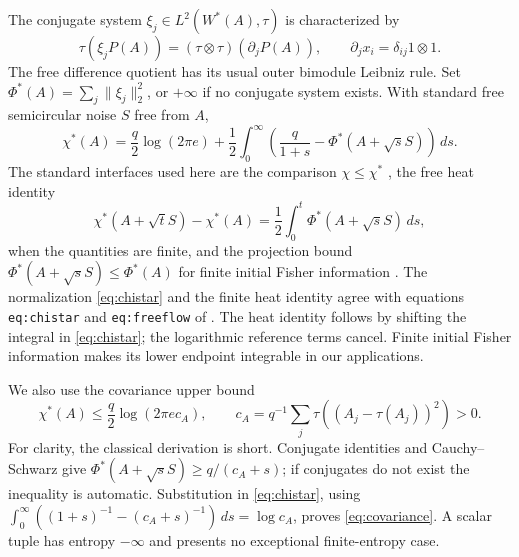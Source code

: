 \documentclass[11pt]{article}
\theoremstyle{definition}\newtheorem{definition}[theorem]{Definition}
\theoremstyle{remark}\newtheorem{remark}[theorem]{Remark}
\begin{document}
The conjugate system $\xi_j\in L^2(W^*(A),\tau)$ is characterized by
\[
 \tau(\xi_j P(A))=(\tau\otimes\tau)(\partial_jP(A)),\qquad
 \partial_jx_i=\delta_{ij}1\otimes1.
\]
The free difference quotient has its usual outer bimodule Leibniz rule.
Set $\Phi^*(A)=\sum_j\|\xi_j\|_2^2$, or $+\infty$ if no conjugate
system exists. With standard free semicircular noise $S$ free from $A$,
\begin{equation}\label{eq:chistar}
 \chi^*(A)=\frac q2\log(2\pi e)+\frac12\int_0^\infty
 \left(\frac q{1+s}-\Phi^*(A+\sqrt s S)\right)\,ds.
\end{equation}
The standard interfaces used here are the comparison
$\chi\leq\chi^*$ \cite{BCG,JP}, the free heat identity
\begin{equation}\label{eq:heat}
 \chi^*(A+\sqrt t S)-\chi^*(A)
 =\frac12\int_0^t\Phi^*(A+\sqrt s S)\,ds,
\end{equation}
when the quantities are finite, and the projection bound
$\Phi^*(A+\sqrt s S)\leq\Phi^*(A)$ for finite initial Fisher
information \cite{Vstar}. The normalization \eqref{eq:chistar} and the
finite heat identity agree with equations \texttt{eq:chistar} and
\texttt{eq:freeflow} of \cite{source298}. The heat identity follows by
shifting the integral in \eqref{eq:chistar}; the logarithmic reference
terms cancel. Finite initial Fisher information makes its lower
endpoint integrable in our applications.

We also use the covariance upper bound
\begin{equation}\label{eq:covariance}
 \chi^*(A)\leq\frac q2\log(2\pi e c_A),\qquad
 c_A=q^{-1}\sum_j\tau((A_j-\tau(A_j))^2)>0.
\end{equation}
For clarity, the classical derivation is short. Conjugate identities
and Cauchy--Schwarz give
$\Phi^*(A+\sqrt s S)\geq q/(c_A+s)$; if conjugates do not exist the
inequality is automatic. Substitution in \eqref{eq:chistar}, using
$\int_0^\infty((1+s)^{-1}-(c_A+s)^{-1})\,ds=\log c_A$, proves
\eqref{eq:covariance}. A scalar tuple has entropy $-\infty$ and presents
no exceptional finite-entropy case.
\end{document}
